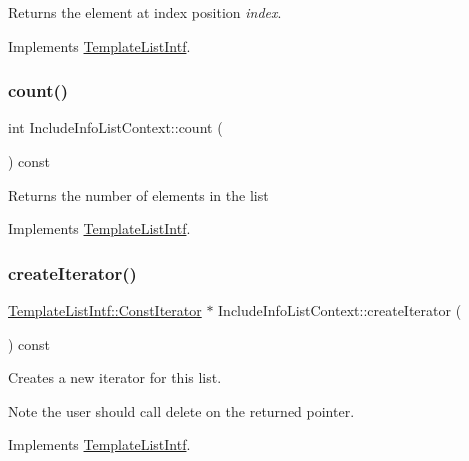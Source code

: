 Returns the element at index position {\itshape index}. 

Implements \mbox{\hyperlink{class_template_list_intf_aa51e57e72eacf4e8ce1055ee30a0f7f8}{Template\+List\+Intf}}.

\mbox{\label{class_include_info_list_context_ac641c82aaf5644cfcfc1e1650f536096}} 
\subsubsection{\texorpdfstring{count()}{count()}}
{\footnotesize\ttfamily int Include\+Info\+List\+Context\+::count (\begin{DoxyParamCaption}{ }\end{DoxyParamCaption}) const\hspace{0.3cm}{\ttfamily [virtual]}}

Returns the number of elements in the list 

Implements \mbox{\hyperlink{class_template_list_intf_a329e49e33484c2aa5106aac1bf4e5216}{Template\+List\+Intf}}.

\mbox{\label{class_include_info_list_context_a205c178e2b416a8fc6779eca9aaddf33}} 
\subsubsection{\texorpdfstring{createIterator()}{createIterator()}}
{\footnotesize\ttfamily \mbox{\hyperlink{class_template_list_intf_1_1_const_iterator}{Template\+List\+Intf\+::\+Const\+Iterator}} $\ast$ Include\+Info\+List\+Context\+::create\+Iterator (\begin{DoxyParamCaption}{ }\end{DoxyParamCaption}) const\hspace{0.3cm}{\ttfamily [virtual]}}

Creates a new iterator for this list. \begin{DoxyNote}{Note}
the user should call delete on the returned pointer. 
\end{DoxyNote}


Implements \mbox{\hyperlink{class_template_list_intf_a56b82384db24c3e121076a1da046d378}{Template\+List\+Intf}}.

